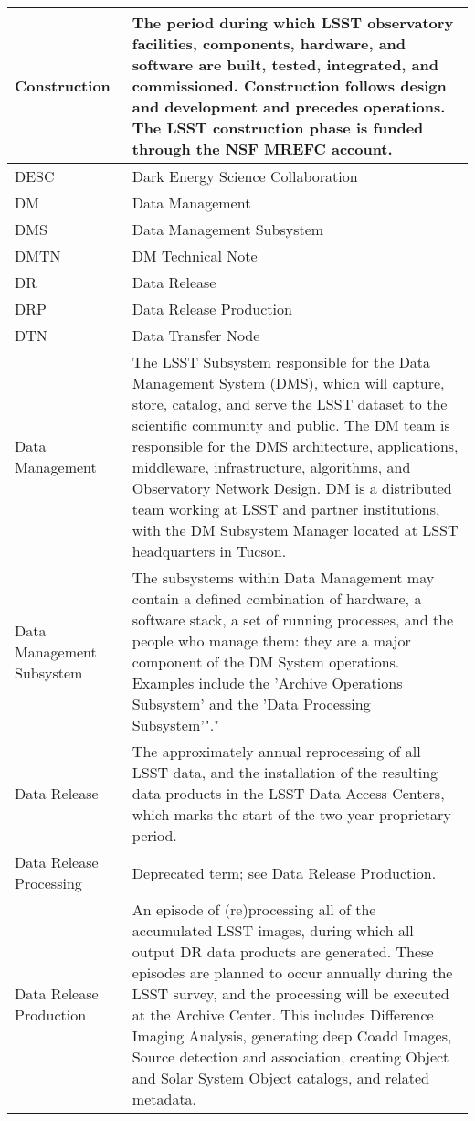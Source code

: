 \begin{longtable}{|l|p{}|}
Construction & The period during which \gls{LSST} observatory facilities, components, hardware, and software are built, tested, integrated, and commissioned. \gls{Construction} follows design and development and precedes operations. The \gls{LSST} construction phase is funded through the \gls{NSF} \gls{MREFC} account. \\\hline
DESC & Dark Energy \gls{Science Collaboration} \\\hline
DM & \gls{Data Management} \\\hline
DMS & \gls{Data Management Subsystem} \\\hline
DMTN & \gls{DM} Technical Note \\\hline
DR & \gls{Data Release} \\\hline
DRP & \gls{Data Release Production} \\\hline
DTN & Data Transfer Node \\\hline
Data Management & The \gls{LSST} Subsystem responsible for the \gls{Data Management System} (\gls{DMS}), which will capture, store, catalog, and serve the \gls{LSST} dataset to the scientific community and public. The \gls{DM} team is responsible for the \gls{DMS} architecture, applications, middleware, infrastructure, algorithms, and Observatory Network Design. \gls{DM} is a distributed team working at \gls{LSST} and partner institutions, with the \gls{DM} \gls{Subsystem Manager} located at \gls{LSST} headquarters in Tucson. \\\hline
Data Management \gls{Subsystem} & The subsystems within \gls{Data Management} may contain a defined combination of hardware, a software \gls{stack}, a set of running processes, and the people who manage them: they are a major component of the \gls{DM} System operations. Examples include the 'Archive \gls{Operations} \gls{Subsystem}' and the 'Data Processing \gls{Subsystem}'"." \\\hline
Data Release & The approximately annual reprocessing of all \gls{LSST} data, and the installation of the resulting data products in the \gls{LSST} Data Access Centers, which marks the start of the two-year proprietary period. \\\hline
Data Release Processing & Deprecated term; see \gls{Data Release Production}. \\\hline
Data Release Production & An episode of (re)processing all of the accumulated \gls{LSST} images, during which all output \gls{DR} data products are generated. These episodes are planned to occur annually during the \gls{LSST} survey, and the processing will be executed at the \gls{Archive} \gls{Center}. This includes Difference Imaging Analysis, generating deep Coadd Images, \gls{Source} detection and association, creating Object and \gls{Solar System Object} catalogs, and related \gls{metadata}. \\\hline

\end{longtable}

